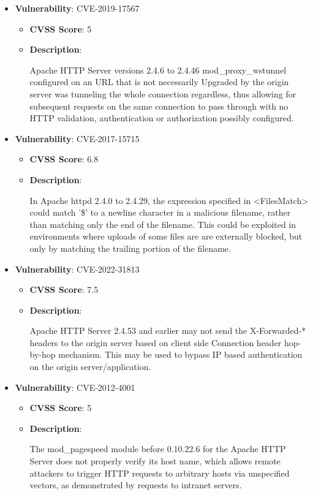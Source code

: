 \documentclass{article}
\begin{document}
\begin{itemize}
        \item \textbf{Vulnerability}: CVE-2019-17567
        \begin{itemize}
            \item \textbf{CVSS Score}:  5 
            \item \textbf{Description}:
            \parbox[t]{0.9\linewidth}{
                \ttfamily Apache HTTP Server versions 2.4.6 to 2.4.46 mod\_proxy\_wstunnel configured on an URL that is not necessarily Upgraded by the origin server was tunneling the whole connection regardless, thus allowing for subsequent requests on the same connection to pass through with no HTTP validation, authentication or authorization possibly configured.
            }
        \end{itemize}
    
        \item \textbf{Vulnerability}: CVE-2017-15715
        \begin{itemize}
            \item \textbf{CVSS Score}:  6.8 
            \item \textbf{Description}:
            \parbox[t]{0.9\linewidth}{
                \ttfamily In Apache httpd 2.4.0 to 2.4.29, the expression specified in <FilesMatch> could match '\$' to a newline character in a malicious filename, rather than matching only the end of the filename. This could be exploited in environments where uploads of some files are are externally blocked, but only by matching the trailing portion of the filename.
            }
        \end{itemize}
    
        \item \textbf{Vulnerability}: CVE-2022-31813
        \begin{itemize}
            \item \textbf{CVSS Score}:  7.5 
            \item \textbf{Description}:
            \parbox[t]{0.9\linewidth}{
                \ttfamily Apache HTTP Server 2.4.53 and earlier may not send the X-Forwarded-* headers to the origin server based on client side Connection header hop-by-hop mechanism. This may be used to bypass IP based authentication on the origin server/application.
            }
        \end{itemize}
    
        \item \textbf{Vulnerability}: CVE-2012-4001
        \begin{itemize}
            \item \textbf{CVSS Score}:  5 
            \item \textbf{Description}:
            \parbox[t]{0.9\linewidth}{
                \ttfamily The mod\_pagespeed module before 0.10.22.6 for the Apache HTTP Server does not properly verify its host name, which allows remote attackers to trigger HTTP requests to arbitrary hosts via unspecified vectors, as demonstrated by requests to intranet servers.
            }
        \end{itemize}
    

\end{itemize}
\end{document}
